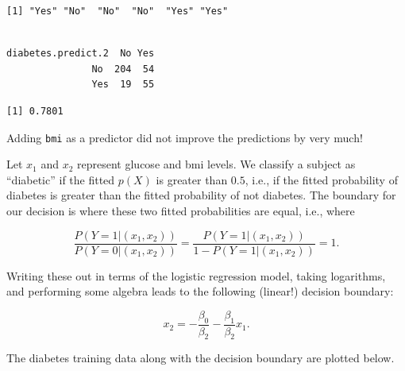 \documentclass[
]{krantz}
\makeatletter
\newenvironment{Shaded}{\begin{snugshade}}{\end{snugshade}}
\newcommand{\DecValTok}[1]{\textcolor[rgb]{0.06,0.06,0.06}{#1}}
\newcommand{\FloatTok}[1]{\textcolor[rgb]{0.06,0.06,0.06}{#1}}
\newcommand{\KeywordTok}[1]{\textcolor[rgb]{0.27,0.27,0.27}{\textbf{#1}}}
\newcommand{\NormalTok}[1]{#1}
\newcommand{\OperatorTok}[1]{\textcolor[rgb]{0.43,0.43,0.43}{\textbf{#1}}}
\newcommand{\StringTok}[1]{\textcolor[rgb]{0.5,0.5,0.5}{#1}}
\newenvironment{kframe}{%
\medskip{}
\setlength{\fboxsep}{.8em}
 \def\at@end@of@kframe{}%
 \ifinner\ifhmode%
  \def\at@end@of@kframe{\end{minipage}}%
  \begin{minipage}{\columnwidth}%
 \fi\fi%
 \def\FrameCommand##1{\hskip\@totalleftmargin \hskip-\fboxsep
 \colorbox{shadecolor}{##1}\hskip-\fboxsep
     \hskip-\linewidth \hskip-\@totalleftmargin \hskip\columnwidth}%
 \MakeFramed {\advance\hsize-\width
   \@totalleftmargin\z@ \linewidth\hsize
   \@setminipage}}%
 {\par\unskip\endMakeFramed%
 \at@end@of@kframe}
\renewenvironment{Shaded}{\begin{kframe}}{\end{kframe}}
\makeatother
\begin{document}
\begin{verbatim}
[1] "Yes" "No"  "No"  "No"  "Yes" "Yes"
\end{verbatim}

\begin{Shaded}
\end{Shaded}

\begin{verbatim}
                  
diabetes.predict.2  No Yes
               No  204  54
               Yes  19  55
\end{verbatim}

\begin{Shaded}
\end{Shaded}

\begin{verbatim}
[1] 0.7801
\end{verbatim}

Adding \texttt{bmi} as a predictor did not improve the predictions by very much!

Let \(x_1\) and \(x_2\) represent glucose and bmi levels. We classify a subject as ``diabetic'' if the fitted \(p(X)\) is greater than \(0.5\), i.e., if the fitted probability of diabetes is greater than the fitted probability of not diabetes. The boundary for our decision is where these two fitted probabilities are equal, i.e., where

\[
\frac{P(Y = 1 | (x_1, x_2))}{P(Y = 0 | (x_1, x_2))} = \frac{P(Y = 1 | (x_1, x_2))}{1 - P(Y = 1 | (x_1, x_2))}  = 1.
\]

Writing these out in terms of the logistic regression model, taking logarithms, and performing some algebra leads to the following (linear!) decision boundary:

\[
x_2 = -\frac{\beta_0}{\beta_2} - \frac{\beta_1}{\beta_2} x_1.
\]

The diabetes training data along with the decision boundary are plotted below.
\end{document}
